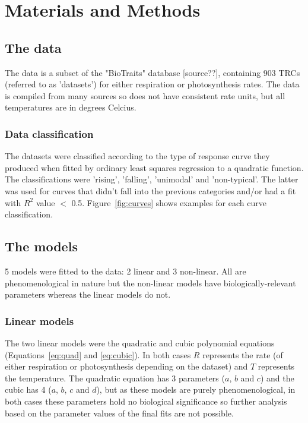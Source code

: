 \documentclass[11pt, a4paper]{article}
\begin{document}
	
		
\section{Materials and Methods}
	
	\subsection{The data}
	The data is a subset of the "BioTraits" database [source??], containing 903 TRCs (referred to as 'datasets') for either respiration or photosynthesis rates. The data is compiled from many sources so does not have consistent rate units, but all temperatures are in degrees Celcius.

	
	\subsubsection*{Data classification}
	The datasets were classified according to the type of response curve they produced when fitted by ordinary least squares regression to a quadratic function. The classifications were 'rising', 'falling', 'unimodal' and 'non-typical'. The latter was used for curves that didn't fall into the previous categories and/or had a fit with $R^2$ value $<$ 0.5. Figure~\ref{fig:curves} shows examples for each curve classification.
	
	\subsection{The models}
	5 models were fitted to the data: 2 linear and 3 non-linear. All are phenomenological in nature but the non-linear models have biologically-relevant parameters whereas the linear models do not. 
	
	\subsubsection*{Linear models}	
	The two linear models were the quadratic and cubic polynomial equations (Equations~\ref{eq:quad} and \ref{eq:cubic}). In both cases $R$ represents the rate (of either respiration or photosynthesis depending on the dataset) and $T$ represents the temperature. The quadratic equation has 3 parameters ($a$, $b$ and $c$) and the cubic has 4 ($a$, $b$, $c$ and $d$), but as these models are purely phenomenological, in both cases these parameters hold no biological significance so further analysis based on the parameter values of the final fits are not possible.
	
\end{document}
